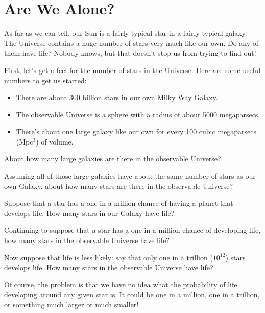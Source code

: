 \section{Are We Alone?}

\makelabheader

\bigskip

As far as we can tell, our Sun is a fairly typical star in a fairly
typical galaxy.  The Universe contains a huge number of stars very much
like our own.  Do any of them have life?  Nobody knows, but that doesn't
stop us from trying to find out!

First, let's get a feel for the number of stars in the Universe.
Here are some useful numbers to get us started:

\begin{itemize}
\item There are about 300 billion stars in our own Milky Way Galaxy.
\item The observable Universe is a sphere with a radius of about
5000 megaparsecs.
\item There's about one large galaxy like our own for every 100 cubic
megaparsecs (Mpc$^3$) of volume.
\end{itemize}

About how many large galaxies are there in the observable Universe?

\answerspace{1.5in}

Assuming all of those large galaxies have about the same number
of stars as our own Galaxy, about how many stars are there in the
observable Universe?

\answerspace{1in}

Suppose that a star has a one-in-a-million chance of having
a planet that develops life.
How many stars in our Galaxy have life?


Continuing to suppose that a star has a one-in-a-million chance
of developing life, how many stars in the observable Universe have life?

\answerspace{1in}

Now suppose that life is less likely: say that only one in a trillion
($10^{12}$) stars develops life.  How many stars in the observable Universe
have life?

\answerspace{1in}

Of course, the problem is that we have no idea what the probability
of life developing around any given star is.  It could be
one in a million, one in a trillion, or something much larger or much smaller!

